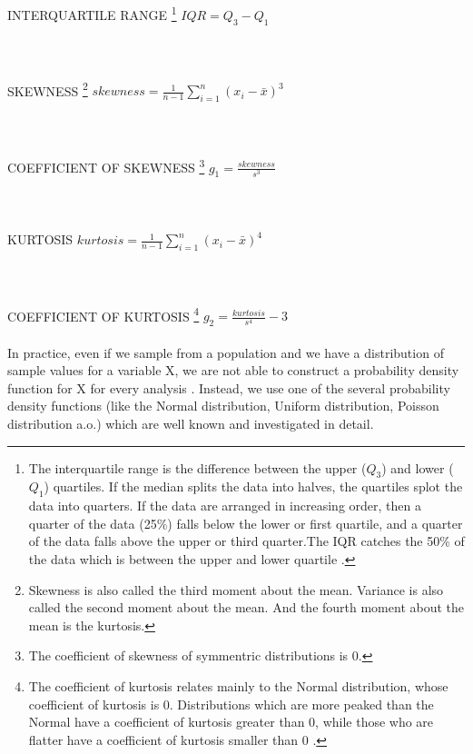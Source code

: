 \documentclass {article}
\begin{document}
\\
\\
\\
\\
INTERQUARTILE RANGE \footnote{The interquartile range is the difference between the upper ($Q_3$) and lower ($Q_1$) quartiles. If the median splits the data into halves, the quartiles splot the data into quarters. If the data are arranged in increasing order, then a quarter of the data (25\%) falls below the lower or first quartile, and a quarter of the data falls above the upper or third quarter.The IQR catches the 50\% of the data which is between the upper and lower quartile \cite{isaaks_applied_1989}.}
 \tab $IQR = Q_3 - Q_1$
\\
\\
\\
\\
SKEWNESS \footnote{Skewness is also called the third moment about the mean. Variance is also called the second moment about the mean. And the fourth moment about the mean is the kurtosis.}
\tab  $skewness =\frac{1}{n-1}\displaystyle\sum_{i=1}^{n}(x_i-\bar{x})^3$
\\
\\
\\
\\
COEFFICIENT OF SKEWNESS \footnote{The coefficient of skewness of symmentric distributions is 0.}
 \tab $g_1 = \frac{skewness}{s^3}$
\\
\\
\\
\\
KURTOSIS \tab  $kurtosis=\frac{1}{n-1}\displaystyle\sum_{i=1}^{n}(x_i-\bar{x})^4$
\\
\\
\\
\\
COEFFICIENT OF KURTOSIS \footnote{The coefficient of kurtosis relates mainly to the Normal distribution, whose coefficient of kurtosis is 0. Distributions which are more peaked than the Normal have a coefficient of kurtosis greater than 0, while those who are flatter have a coefficient of kurtosis smaller than 0 \cite{webster_geostatistics_2007}.}
\tab $g_2 = \frac {kurtosis}{s^4}-3$
\\
\\
In practice, even if we sample from a population and we have a distribution of sample values for a variable X, we are not able to construct a probability density function for X for every analysis \cite{lial_calculus_2012}.
 Instead, we use one of the several probability density functions (like the Normal distribution, Uniform distribution, Poisson distribution a.o.) which are well known and investigated in detail.   
\end{document}
